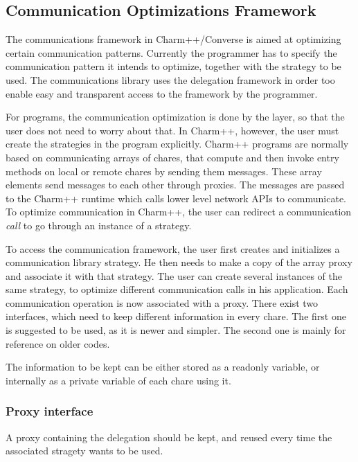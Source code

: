 \subsection{Communication Optimizations Framework}

The communications framework in Charm++/Converse is aimed at optimizing certain
communication patterns. Currently the programmer has to specify the
communication pattern it intends to optimize, together with the strategy to be
used. The communications library uses the delegation framework in order too
enable easy and transparent access to the framework by the programmer.

For \ampi{} programs, the communication optimization is done by the \ampi{}
layer, so that the user does not need to worry about that. In Charm++, however,
the user must create the strategies in the program explicitly. Charm++ programs
are normally based on communicating arrays of chares, that compute and then
invoke entry methods on local or remote chares by sending them messages. These
array elements send messages to each other through proxies. The messages are
passed to the Charm++ runtime which calls lower level network APIs to
communicate. To optimize communication in Charm++, the user can redirect a
communication {\em call} to go through an instance of a strategy.

To access the communication framework, the user first creates and initializes a
communication library strategy. He then needs to make a copy of the array proxy
and associate it with that strategy. The user can create several instances of
the same strategy, to optimize different communication calls in his application.
Each communication operation is now associated with a proxy. There exist two
interfaces, which need to keep different information in every chare. The first
one is suggested to be used, as it is newer and simpler. The second one is
mainly for reference on older codes.

The information to be kept can be either stored as a readonly variable, or
internally as a private variable of each chare using it.

\subsubsection{Proxy interface}

A proxy containing the delegation should be kept, and reused every time the
associated stragety wants to be used.

